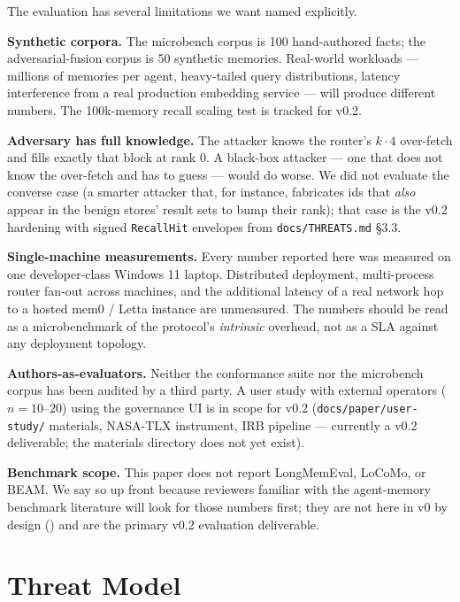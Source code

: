\documentclass[11pt,letterpaper,twocolumn]{article}
\begin{document}
The evaluation has several limitations we want named explicitly.

\textbf{Synthetic corpora.} The microbench corpus is 100 hand-authored facts; the adversarial-fusion corpus is 50 synthetic memories. Real-world workloads --- millions of memories per agent, heavy-tailed query distributions, latency interference from a real production embedding service --- will produce different numbers. The 100k-memory recall scaling test is tracked for v0.2.

\textbf{Adversary has full knowledge.} The  attacker knows the router's $k \cdot 4$ over-fetch and fills exactly that block at rank 0. A black-box attacker --- one that does not know the over-fetch and has to guess --- would do worse. We did not evaluate the converse case (a smarter attacker that, for instance, fabricates ids that \emph{also} appear in the benign stores' result sets to bump their rank); that case is the v0.2 hardening with signed \texttt{RecallHit} envelopes from \texttt{docs/THREATS.md} \S3.3.

\textbf{Single-machine measurements.} Every number reported here was measured on one developer-class Windows 11 laptop. Distributed deployment, multi-process router fan-out across machines, and the additional latency of a real network hop to a hosted mem0 / Letta instance are unmeasured. The numbers should be read as a microbenchmark of the protocol's \emph{intrinsic} overhead, not as a SLA against any deployment topology.

\textbf{Authors-as-evaluators.} Neither the conformance suite nor the microbench corpus has been audited by a third party. A user study with external operators ($n=10$--$20$) using the governance UI is in scope for v0.2 (\texttt{docs/paper/user-study/} materials, NASA-TLX instrument, IRB pipeline --- currently a v0.2 deliverable; the materials directory does not yet exist).

\textbf{Benchmark scope.} This paper does not report LongMemEval, LoCoMo, or BEAM. We say so up front because reviewers familiar with the agent-memory benchmark literature will look for those numbers first; they are not here in v0 by design () and are the primary v0.2 evaluation deliverable.

\section{Threat Model}
\label{sec:threats}
\end{document}
